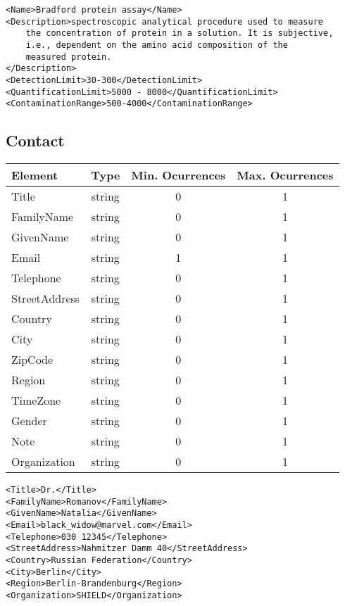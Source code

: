 \documentclass[a4paper]{report}
\begin{document}
\begin{lstlisting}[basicstyle=\footnotesize, caption={Example of Assay}]
<Name>Bradford protein assay</Name>
<Description>spectroscopic analytical procedure used to measure
    the concentration of protein in a solution. It is subjective,
    i.e., dependent on the amino acid composition of the
    measured protein.
</Description>
<DetectionLimit>30-300</DetectionLimit>
<QuantificationLimit>5000 - 8000</QuantificationLimit>
<ContaminationRange>500-4000</ContaminationRange>
\end{lstlisting}

\subsection{Contact}

\begin{tabular}{|l|c|c|c|}
    \hline
    \textbf{Element} & \textbf{Type} & \textbf{Min. Ocurrences} & \textbf{Max. Ocurrences} \\
    \hline
    Title & string & 0 & 1 \\
    FamilyName & string & 0 & 1 \\
    GivenName & string & 0 & 1 \\
    Email & string & 1 & 1 \\
    Telephone & string & 0 & 1 \\
    StreetAddress & string & 0 & 1\\
    Country & string & 0 & 1 \\
    City & string & 0 & 1 \\
    ZipCode & string & 0 & 1 \\
    Region & string & 0 & 1 \\
    TimeZone & string & 0 & 1 \\
    Gender & string & 0 & 1 \\
    Note & string & 0 & 1 \\
    Organization & string & 0 & 1 \\
    \hline
\end{tabular}

\begin{lstlisting}[basicstyle=\footnotesize, caption={Example of Contact}]
<Title>Dr.</Title>
<FamilyName>Romanov</FamilyName>
<GivenName>Natalia</GivenName>
<Email>black_widow@marvel.com</Email>
<Telephone>030 12345</Telephone>
<StreetAddress>Nahmitzer Damm 40</StreetAddress>
<Country>Russian Federation</Country>
<City>Berlin</City>
<Region>Berlin-Brandenburg</Region>
<Organization>SHIELD</Organization>
\end{lstlisting}
\end{document}
